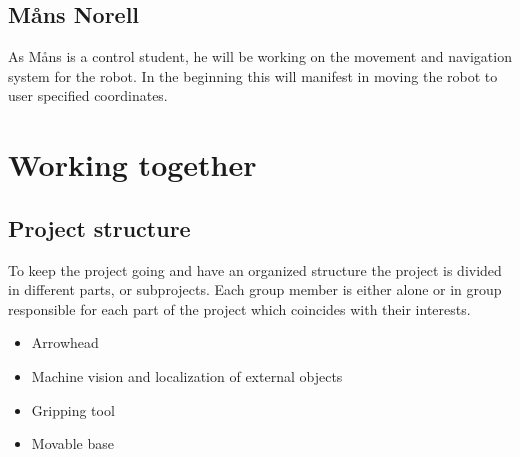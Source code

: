 \section*{Måns Norell}
As Måns is a control student, he will be working on the movement and navigation system for the robot. In the beginning this will manifest in moving the robot to user specified coordinates.

\chapter{Working together}
\section*{Project structure}
To keep the project going and have an organized structure the project is divided 
in different parts, or subprojects. Each group member is either alone or in group responsible for each part of the project which coincides with their interests. 
\begin{itemize}
    \item Arrowhead
    \item Machine vision and localization of external objects
    \item Gripping tool
    \item Movable base
\end{itemize}

